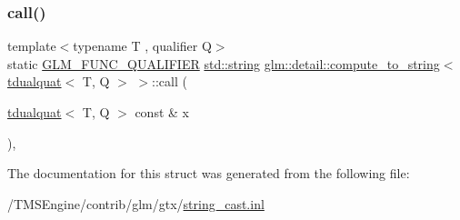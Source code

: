 \subsubsection{\texorpdfstring{call()}{call()}}
{\footnotesize\ttfamily template$<$typename T , qualifier Q$>$ \\
static \hyperlink{setup_8hpp_a33fdea6f91c5f834105f7415e2a64407}{G\+L\+M\+\_\+\+F\+U\+N\+C\+\_\+\+Q\+U\+A\+L\+I\+F\+I\+ER} \hyperlink{_s_d_l__opengl__glext_8h_ae84541b4f3d8e1ea24ec0f466a8c568b}{std\+::string} \hyperlink{structglm_1_1detail_1_1compute__to__string}{glm\+::detail\+::compute\+\_\+to\+\_\+string}$<$ \hyperlink{structglm_1_1tdualquat}{tdualquat}$<$ T, Q $>$ $>$\+::call (\begin{DoxyParamCaption}\item[{\hyperlink{structglm_1_1tdualquat}{tdualquat}$<$ T, Q $>$ const \&}]{x }\end{DoxyParamCaption})\hspace{0.3cm}{\ttfamily [inline]}, {\ttfamily [static]}}



The documentation for this struct was generated from the following file\+:\begin{DoxyCompactItemize}
\item 
/\+T\+M\+S\+Engine/contrib/glm/gtx/\hyperlink{string__cast_8inl}{string\+\_\+cast.\+inl}\end{DoxyCompactItemize}
